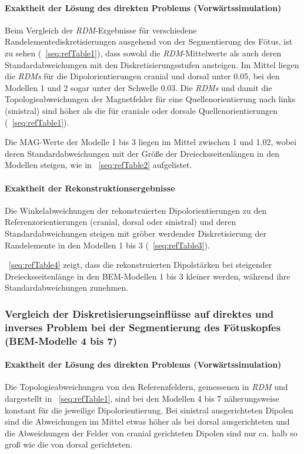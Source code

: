 \paragraph{Exaktheit der Lösung des direkten Problems
(Vorwärtssimulation)}
Beim Vergleich der \textit{RDM}{}-Ergebnisse für verschiedene
Randelementediskretisierungen ausgehend von der Segmentierung des
Fötus, ist zu sehen (\tablename~\ref{seq:refTable1}), dass sowohl die
\textit{RDM}{}-Mittelwerte als auch deren Standardabweichungen mit den
Diskretisierungsstufen ansteigen. Im Mittel liegen die \textit{RDMs
}für die Dipolorientierungen cranial und dorsal unter 0.05, bei den
Modellen 1 und 2 sogar unter der Schwelle 0.03. Die \textit{RDMs} und
damit die Topologieabweichungen der Magnetfelder für eine
Quellenorientierung nach links (sinistral) sind höher als die für
craniale oder dorsale Quellenorientierungen
(\tablename~\ref{seq:refTable1}).

Die MAG-Werte der Modelle 1 bis 3 liegen im Mittel zwischen 1 und 1.02,
wobei deren Standardabweichungen mit der Größe der Dreiecksseitenlängen
in den Modellen steigen, wie in \tablename~\ref{seq:refTable2}
aufgelistet.

\paragraph[Exaktheit der Rekonstruktionsergebnisse]{Exaktheit der
Rekonstruktionsergebnisse}
Die Winkelabweichungen der rekonstruierten Dipolorientierungen zu den
Referenzorientierungen (cranial, dorsal oder sinistral) und deren
Standardabweichungen steigen mit gröber werdender Diskretisierung der
Randelemente in den Modellen 1 bis 3 (\tablename~\ref{seq:refTable3}).

\tablename~\ref{seq:refTable4} zeigt, dass die rekonstruierten
Dipolstärken bei steigender Dreiecksseitenlänge in den BEM-Modellen 1
bis 3 kleiner werden, während ihre Standardabweichungen zunehmen.

\subsubsection{Vergleich der Diskretisierungseinflüsse auf direktes und
inverses Problem bei der Segmentierung des Fötuskopfes (BEM-Modelle 4
bis 7)}
\paragraph{Exaktheit der Lösung des direkten Problems
(Vorwärtssimulation)}
Die Topologieabweichungen von den Referenzfeldern, gemessenen in
\textit{RDM} und dargestellt in \tablename~\ref{seq:refTable1}, sind
bei den Modellen 4 bis 7 näherungsweise konstant für die jeweilige
Dipolorientierung. Bei sinistral ausgerichteten Dipolen sind die
Abweichungen im Mittel etwas höher als bei dorsal ausgerichteten und
die Abweichungen der Felder von cranial gerichteten Dipolen sind nur
ca. halb so groß wie die von dorsal gerichteten.

